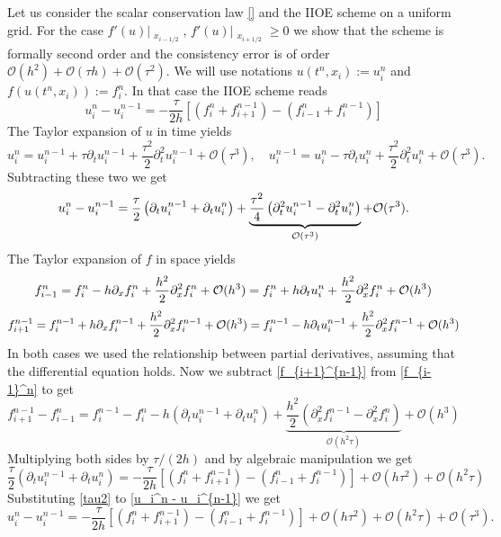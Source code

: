 \documentclass[../include.tex]{subfiles}
\begin{document}
	Let us consider the scalar conservation law \eqref{} and the IIOE scheme on a uniform grid. For the case $ f'(u)\big|_{\substack{x_{i-1/2}}},\,f'(u)\big|_{\substack{x_{i+1/2}}} \geq 0 $ we show that the scheme is formally second order and the consistency error is of order $\mathcal{O}(h^2) + \mathcal{O}(\tau h) + \mathcal{O}(\tau^2)$. We will use notations $ u(t^n, x_i) := u^n_i $ and $ f(u(t^n, x_i)) := f^n_i $. In that case the IIOE scheme reads
	\[
	u_i^{n} - u_i^{n - 1} = - \frac{\tau}{2h}\left[(f_i^n + f_{i+1}^{n-1}) - (f_{i-1}^n + f_i^{n-1})\right]
	\]
	The Taylor expansion of $ u $ in time yields
	\[
	u_i^n = u_i^{n-1} + \tau \partial_t u_i^{n-1} + \frac{\tau^2}{2}\partial_t^2 u_i^{n-1} + \mathcal{O}(\tau^3),\quad
	u_i^{n-1} = u_i^{n} - \tau \partial_t u_i^n + \frac{\tau^2}{2}\partial_t^2 u_i^n + \mathcal{O}(\tau^3).
	\]
	Subtracting these two we get
	\begin{equation}
		u_i^n - u_i^{n-1} = \frac{\tau}{2}\left(\partial_t u_i^{n-1} + \partial_t u_i^n\right) + 
		\underbrace{\frac{\tau^2}{4}\left(\partial_t^2 u_i^{n-1} - \partial_t^2 u_i^n\right)}_{\mathcal{O}(\tau^3)}
		 + \mathcal{O}(\tau^3).
		 \label{u_i^n - u_i^{n-1}}
	\end{equation}
	The Taylor expansion of $ f $ in space yields
	\begin{equation}
	f_{i-1}^n = f_i^n - h\partial_x f_i^n + \frac{h^2}{2}\partial_x^2 f_i^n + \mathcal{O}(h^3) = f_i^n + h\partial_t u_i^n + \frac{h^2}{2}\partial_x^2 f_i^n + \mathcal{O}(h^3)
	\label{f_{i-1}^n}
	\end{equation}
	\begin{equation}
	f_{i+1}^{n-1} = f_i^{n-1} + h \partial_x f_i^{n-1} + \frac{h^2}{2} \partial_x^2 f_i^{n-1} + \mathcal{O}(h^3) = 
	f_i^{n-1} - h \partial_t u_i^{n-1} + \frac{h^2}{2} \partial_x^2 f_i^{n-1} + \mathcal{O}(h^3)
	\label{f_{i+1}^{n-1}}
	\end{equation}
	In both cases we used the relationship between partial derivatives, assuming that the differential equation holds.
	Now we subtract \eqref{f_{i+1}^{n-1}} from \eqref{f_{i-1}^n} to get
	\[
	f_{i+1}^{n-1} - f_{i-1}^n = f_i^{n-1} - f_i^n - h\left(\partial_t u_i^{n-1} + \partial_t u_i^{n}\right)
	+ \underbrace{\frac{h^2}{2} \left(\partial_x^2 f_i^{n-1} - \partial_x^2 f_i^{n}\right)}_{\mathcal{O}(h^2\tau)} + \mathcal{O}(h^3)
	\]
	Multiplying both sides by $ \tau/(2h) $ and by algebraic manipulation we get
	\begin{equation}
		\frac{\tau}{2}\left(\partial_t u_i^{n-1} + \partial_t u_i^{n}\right) = - \frac{\tau}{2h}\left[(f_i^n + f_{i+1}^{n-1}) - (f_{i-1}^n + f_i^{n-1})\right] + \mathcal{O}(h\tau^2) + \mathcal{O}(h^2\tau)
		\label{tau2}
	\end{equation}
Substituting \eqref{tau2} to \eqref{u_i^n - u_i^{n-1}} we get
	\begin{equation}
		u_i^n - u_i^{n-1} = - \frac{\tau}{2h}\left[(f_i^n + f_{i+1}^{n-1}) - (f_{i-1}^n + f_i^{n-1})\right] + \mathcal{O}(h\tau^2) + \mathcal{O}(h^2\tau) + \mathcal{O}(\tau^3).
	\end{equation}
\end{document}
